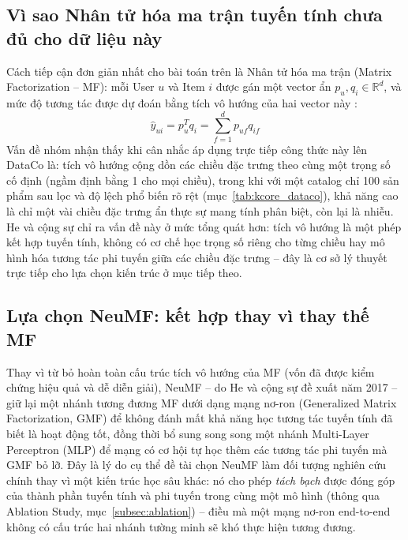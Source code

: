 \subsection{Vì sao Nhân tử hóa ma trận tuyến tính chưa đủ cho dữ liệu này}
\label{subsec:hanche_cf}

Cách tiếp cận đơn giản nhất cho bài toán trên là Nhân tử hóa ma trận (Matrix Factorization -- MF): mỗi User $u$ và Item $i$ được gán một vector ẩn $p_u, q_i \in \mathbb{R}^d$, và mức độ tương tác được dự đoán bằng tích vô hướng của hai vector này \parencite{koren2009matrix}:
\begin{equation}
    \hat{y}_{ui} = p_u^T q_i = \sum_{f=1}^{d} p_{uf} q_{if}
    \label{eq:mf_intro}
\end{equation}
Vấn đề nhóm nhận thấy khi cân nhắc áp dụng trực tiếp công thức này lên DataCo là: tích vô hướng cộng dồn các chiều đặc trưng theo cùng một trọng số cố định (ngầm định bằng 1 cho mọi chiều), trong khi với một catalog chỉ 100 sản phẩm sau lọc và độ lệch phổ biến rõ rệt (mục~\ref{tab:kcore_dataco}), khả năng cao là chỉ một vài chiều đặc trưng ẩn thực sự mang tính phân biệt, còn lại là nhiễu. He và cộng sự \parencite{he2017ncf} chỉ ra vấn đề này ở mức tổng quát hơn: tích vô hướng là một phép kết hợp tuyến tính, không có cơ chế học trọng số riêng cho từng chiều hay mô hình hóa tương tác phi tuyến giữa các chiều đặc trưng -- đây là cơ sở lý thuyết trực tiếp cho lựa chọn kiến trúc ở mục tiếp theo.

\subsection{Lựa chọn NeuMF: kết hợp thay vì thay thế MF}
\label{subsec:sumenh_neumf}

Thay vì từ bỏ hoàn toàn cấu trúc tích vô hướng của MF (vốn đã được kiểm chứng hiệu quả và dễ diễn giải), NeuMF -- do He và cộng sự đề xuất năm 2017 \parencite{he2017ncf} -- giữ lại một nhánh tương đương MF dưới dạng mạng nơ-ron (Generalized Matrix Factorization, GMF) để không đánh mất khả năng học tương tác tuyến tính đã biết là hoạt động tốt, đồng thời bổ sung song song một nhánh Multi-Layer Perceptron (MLP) để mạng có cơ hội tự học thêm các tương tác phi tuyến mà GMF bỏ lỡ. Đây là lý do cụ thể đề tài chọn NeuMF làm đối tượng nghiên cứu chính thay vì một kiến trúc học sâu khác: nó cho phép \emph{tách bạch} được đóng góp của thành phần tuyến tính và phi tuyến trong cùng một mô hình (thông qua Ablation Study, mục~\ref{subsec:ablation}) -- điều mà một mạng nơ-ron end-to-end không có cấu trúc hai nhánh tường minh sẽ khó thực hiện tương đương.

